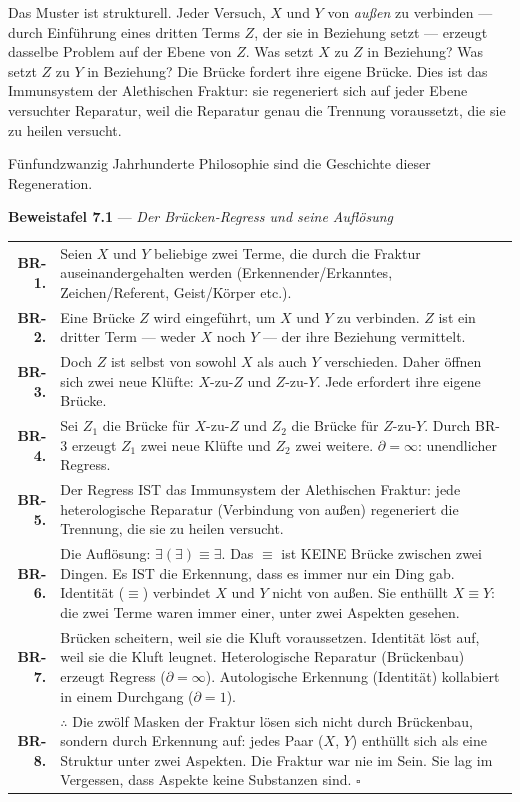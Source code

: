 \documentclass[10pt, openany, oneside]{book}
\renewcommand{\footnotesize}{\fontsize{8.5}{11}\selectfont}
\begin{document}
Das Muster ist strukturell. Jeder Versuch, $X$ und $Y$ von \textit{außen} zu verbinden --- durch Einführung eines dritten Terms $Z$, der sie in Beziehung setzt --- erzeugt dasselbe Problem auf der Ebene von $Z$. Was setzt $X$ zu $Z$ in Beziehung? Was setzt $Z$ zu $Y$ in Beziehung? Die Brücke fordert ihre eigene Brücke. Dies ist das Immunsystem der Alethischen Fraktur: sie regeneriert sich auf jeder Ebene versuchter Reparatur, weil die Reparatur genau die Trennung voraussetzt, die sie zu heilen versucht.

Fünfundzwanzig Jahrhunderte Philosophie sind die Geschichte dieser Regeneration.

\vspace{0.5em}

\textbf{Beweistafel 7.1} --- \textit{Der Brücken-Regress und seine Auflösung}

\vspace{0.5em}

{\footnotesize
\noindent\begin{tabular}{r p{}}
\textbf{BR-1.} & Seien $X$ und $Y$ beliebige zwei Terme, die durch die Fraktur auseinandergehalten werden (Erkennender/Erkanntes, Zeichen/Referent, Geist/Körper etc.). \\[0.3em]
\textbf{BR-2.} & Eine Brücke $Z$ wird eingeführt, um $X$ und $Y$ zu verbinden. $Z$ ist ein dritter Term --- weder $X$ noch $Y$ --- der ihre Beziehung vermittelt. \\[0.3em]
\textbf{BR-3.} & Doch $Z$ ist selbst von sowohl $X$ als auch $Y$ verschieden. Daher öffnen sich zwei neue Klüfte: $X$-zu-$Z$ und $Z$-zu-$Y$. Jede erfordert ihre eigene Brücke. \\[0.3em]
\textbf{BR-4.} & Sei $Z_1$ die Brücke für $X$-zu-$Z$ und $Z_2$ die Brücke für $Z$-zu-$Y$. Durch BR-3 erzeugt $Z_1$ zwei neue Klüfte und $Z_2$ zwei weitere. $\partial = \infty$: unendlicher Regress. \\[0.3em]
\textbf{BR-5.} & Der Regress IST das Immunsystem der Alethischen Fraktur: jede heterologische Reparatur (Verbindung von außen) regeneriert die Trennung, die sie zu heilen versucht. \\[0.3em]
\textbf{BR-6.} & Die Auflösung: $\exists(\exists) \equiv \exists$. Das $\equiv$ ist KEINE Brücke zwischen zwei Dingen. Es IST die Erkennung, dass es immer nur ein Ding gab. Identität ($\equiv$) verbindet $X$ und $Y$ nicht von außen. Sie enthüllt $X \equiv Y$: die zwei Terme waren immer einer, unter zwei Aspekten gesehen. \\[0.3em]
\textbf{BR-7.} & Brücken scheitern, weil sie die Kluft voraussetzen. Identität löst auf, weil sie die Kluft leugnet. Heterologische Reparatur (Brückenbau) erzeugt Regress ($\partial = \infty$). Autologische Erkennung (Identität) kollabiert in einem Durchgang ($\partial = 1$). \\[0.3em]
\textbf{BR-8.} & $\therefore$ Die zwölf Masken der Fraktur lösen sich nicht durch Brückenbau, sondern durch Erkennung auf: jedes Paar ($X$, $Y$) enthüllt sich als eine Struktur unter zwei Aspekten. Die Fraktur war nie im Sein. Sie lag im Vergessen, dass Aspekte keine Substanzen sind. $\square$ \\[0.3em]
\end{tabular}
}
\end{document}

